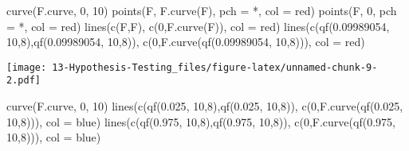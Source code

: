 \documentclass[
]{book}
\newenvironment{Shaded}{\begin{snugshade}}{\end{snugshade}}
\newcommand{\AttributeTok}[1]{\textcolor[rgb]{0.77,0.63,0.00}{#1}}
\newcommand{\DecValTok}[1]{\textcolor[rgb]{0.00,0.00,0.81}{#1}}
\newcommand{\FloatTok}[1]{\textcolor[rgb]{0.00,0.00,0.81}{#1}}
\newcommand{\FunctionTok}[1]{\textcolor[rgb]{0.00,0.00,0.00}{#1}}
\newcommand{\NormalTok}[1]{#1}
\newcommand{\StringTok}[1]{\textcolor[rgb]{0.31,0.60,0.02}{#1}}
\begin{document}
\begin{Shaded}
\begin{Highlighting}[]
\FunctionTok{curve}\NormalTok{(F.curve, }\DecValTok{0}\NormalTok{, }\DecValTok{10}\NormalTok{)}
\FunctionTok{points}\NormalTok{(F, }\FunctionTok{F.curve}\NormalTok{(F), }\AttributeTok{pch =} \StringTok{\textquotesingle{}*\textquotesingle{}}\NormalTok{, }\AttributeTok{col =} \StringTok{\textquotesingle{}red\textquotesingle{}}\NormalTok{)}
\FunctionTok{points}\NormalTok{(F, }\DecValTok{0}\NormalTok{, }\AttributeTok{pch =} \StringTok{\textquotesingle{}*\textquotesingle{}}\NormalTok{, }\AttributeTok{col =} \StringTok{\textquotesingle{}red\textquotesingle{}}\NormalTok{)}
\FunctionTok{lines}\NormalTok{(}\FunctionTok{c}\NormalTok{(F,F), }\FunctionTok{c}\NormalTok{(}\DecValTok{0}\NormalTok{,}\FunctionTok{F.curve}\NormalTok{(F)), }\AttributeTok{col =} \StringTok{\textquotesingle{}red\textquotesingle{}}\NormalTok{)}
\FunctionTok{lines}\NormalTok{(}\FunctionTok{c}\NormalTok{(}\FunctionTok{qf}\NormalTok{(}\FloatTok{0.09989054}\NormalTok{, }\DecValTok{10}\NormalTok{,}\DecValTok{8}\NormalTok{),}\FunctionTok{qf}\NormalTok{(}\FloatTok{0.09989054}\NormalTok{, }\DecValTok{10}\NormalTok{,}\DecValTok{8}\NormalTok{)), }\FunctionTok{c}\NormalTok{(}\DecValTok{0}\NormalTok{,}\FunctionTok{F.curve}\NormalTok{(}\FunctionTok{qf}\NormalTok{(}\FloatTok{0.09989054}\NormalTok{, }\DecValTok{10}\NormalTok{,}\DecValTok{8}\NormalTok{))), }\AttributeTok{col =} \StringTok{\textquotesingle{}red\textquotesingle{}}\NormalTok{)}
\end{Highlighting}
\end{Shaded}

\texttt{[image: 13-Hypothesis-Testing\_files/figure-latex/unnamed-chunk-9-2.pdf]}

\begin{Shaded}
\begin{Highlighting}[]
\FunctionTok{curve}\NormalTok{(F.curve, }\DecValTok{0}\NormalTok{, }\DecValTok{10}\NormalTok{)}
\FunctionTok{lines}\NormalTok{(}\FunctionTok{c}\NormalTok{(}\FunctionTok{qf}\NormalTok{(}\FloatTok{0.025}\NormalTok{, }\DecValTok{10}\NormalTok{,}\DecValTok{8}\NormalTok{),}\FunctionTok{qf}\NormalTok{(}\FloatTok{0.025}\NormalTok{, }\DecValTok{10}\NormalTok{,}\DecValTok{8}\NormalTok{)), }\FunctionTok{c}\NormalTok{(}\DecValTok{0}\NormalTok{,}\FunctionTok{F.curve}\NormalTok{(}\FunctionTok{qf}\NormalTok{(}\FloatTok{0.025}\NormalTok{, }\DecValTok{10}\NormalTok{,}\DecValTok{8}\NormalTok{))), }\AttributeTok{col =} \StringTok{\textquotesingle{}blue\textquotesingle{}}\NormalTok{)}
\FunctionTok{lines}\NormalTok{(}\FunctionTok{c}\NormalTok{(}\FunctionTok{qf}\NormalTok{(}\FloatTok{0.975}\NormalTok{, }\DecValTok{10}\NormalTok{,}\DecValTok{8}\NormalTok{),}\FunctionTok{qf}\NormalTok{(}\FloatTok{0.975}\NormalTok{, }\DecValTok{10}\NormalTok{,}\DecValTok{8}\NormalTok{)), }\FunctionTok{c}\NormalTok{(}\DecValTok{0}\NormalTok{,}\FunctionTok{F.curve}\NormalTok{(}\FunctionTok{qf}\NormalTok{(}\FloatTok{0.975}\NormalTok{, }\DecValTok{10}\NormalTok{,}\DecValTok{8}\NormalTok{))), }\AttributeTok{col =} \StringTok{\textquotesingle{}blue\textquotesingle{}}\NormalTok{)}
\end{Highlighting}
\end{Shaded}
\end{document}
